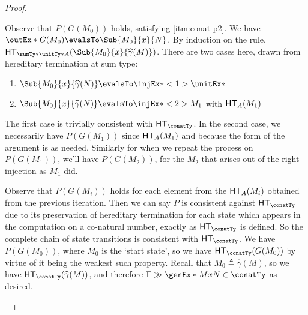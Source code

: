 \documentclass[letterpaper]{article}
\newcommand{\gmhat}[1]{\ensuremath{\widehat{\gamma}(#1)}}
\begin{document}
\begin{proof}
\begin{enumerate}
            Observe that $P(G(M_0))$ holds, satisfying \ref{itm:conat-p2}.
            We have $\outEx*{G(M_0)} \evalsTo \Sub{M_0}{x}{N}$.
            By induction on the rule, $\HT[\sumTy*{\unitTy*}{A}](\Sub{M_0}{x}{\gmhat{M}})$.
            There are two cases here, drawn from hereditary termination at sum type:

            \begin{enumerate}
                \item $\Sub{M_0}{x}{\gmhat{N}} \evalsTo \injEx*<1>{\unitEx*}$
                \item $\Sub{M_0}{x}{\gmhat{N}} \evalsTo \injEx*<2>{M_1}$ with $\HT[A](M_1)$
            \end{enumerate}

            The first case is trivially consistent with $\HT[\conatTy]$.
            In the second case, we necessarily have $P(G(M_1))$ since
            $\HT[A](M_1)$ and because the form of the argument is as needed.
            Similarly for when we repeat the process on $P(G(M_1))$, we'll have
            $P(G(M_2))$, for the $M_2$ that arises out of the right injection
            as $M_1$ did.

            Observe that $P(G(M_i))$ holds for each element from the
            $\HT[A](M_i)$ obtained from the previous iteration.
            Then we can say $P$ is consistent against $\HT[\conatTy]$ due to
            its preservation of hereditary termination for each state which
            appears in the computation on a co-natural number, exactly as
            $\HT[\conatTy]$ is defined.
            So the complete chain of state transitions is consistent with
            $\HT[\conatTy]$.
            We have $P(G(M_0))$, where $M_0$ is the `start state', so we have
            $\HT[\conatTy](G(M_0))$ by virtue of it being the weakest such
            property.
            Recall that $M_0 \triangleq \gmhat{M}$, so we have
            $\HT[\conatTy](\gmhat{M})$, and therefore $\Gamma \gg
            \genEx*{M}{x}{N} \in \conatTy$ as desired.
            
            
    \end{enumerate}
\end{proof}
\end{document}
